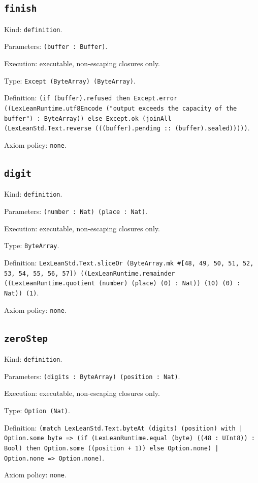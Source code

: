 \documentclass[11pt]{article}
\begin{document}
\subsection*{\texttt{finish}}
\noindent Kind: \texttt{definition}.\par
\noindent Parameters: \texttt{(buffer : Buffer)}.\par
\noindent Execution: executable, non-escaping closures only.\par
\noindent Type: \texttt{Except (ByteArray) (ByteArray)}.\par
\noindent Definition: \texttt{(if (buffer).refused then Except.error ((LexLeanRuntime.utf8Encode ("output exceeds the capacity of the buffer") : ByteArray)) else Except.ok (joinAll (LexLeanStd.Text.reverse (((buffer).pending :: (buffer).sealed)))))}.\par
\noindent Axiom policy: \texttt{none}.\par
\subsection*{\texttt{digit}}
\noindent Kind: \texttt{definition}.\par
\noindent Parameters: \texttt{(number : Nat) (place : Nat)}.\par
\noindent Execution: executable, non-escaping closures only.\par
\noindent Type: \texttt{ByteArray}.\par
\noindent Definition: \texttt{LexLeanStd.Text.sliceOr (ByteArray.mk \#[48, 49, 50, 51, 52, 53, 54, 55, 56, 57]) ((LexLeanRuntime.remainder ((LexLeanRuntime.quotient (number) (place) (0) : Nat)) (10) (0) : Nat)) (1)}.\par
\noindent Axiom policy: \texttt{none}.\par
\subsection*{\texttt{zeroStep}}
\noindent Kind: \texttt{definition}.\par
\noindent Parameters: \texttt{(digits : ByteArray) (position : Nat)}.\par
\noindent Execution: executable, non-escaping closures only.\par
\noindent Type: \texttt{Option (Nat)}.\par
\noindent Definition: \texttt{(match LexLeanStd.Text.byteAt (digits) (position) with | Option.some byte => (if (LexLeanRuntime.equal (byte) ((48 : UInt8)) : Bool) then Option.some ((position + 1)) else Option.none) | Option.none => Option.none)}.\par
\noindent Axiom policy: \texttt{none}.\par
\end{document}
